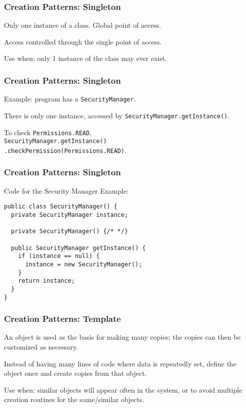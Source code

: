 \begin{frame}
\frametitle{Creation Patterns: Singleton}
\begin{changemargin}{1cm}
Only one instance of a class. Global point of access.

Access controlled through the single point of access.

Use when: only 1 instance of the class may ever exist.

\end{changemargin}
\end{frame}

\begin{frame}
\frametitle{Creation Patterns: Singleton}
\begin{changemargin}{1cm}

Example: program has a \texttt{SecurityManager}.

There is only one instance, accessed by \texttt{SecurityManager.getInstance()}.

To check \texttt{Permissions.READ},\\ \texttt{SecurityManager.getInstance()\\.checkPermission(Permissions.READ)}.


\end{changemargin}
\end{frame}

\begin{frame}[fragile]
\frametitle{Creation Patterns: Singleton}
\begin{changemargin}{1cm}
Code for the Security Manager Example:

\begin{verbatim}
public class SecurityManager() {
  private SecurityManager instance;
  
  private SecurityManager() {/* */}
  
  public SecurityManager getInstance() {
    if (instance == null) {
      instance = new SecurityManager();
    }
    return instance;
  }
}  
\end{verbatim}
\end{changemargin}
\end{frame}


\begin{frame}
\frametitle{Creation Patterns: Template}
\begin{changemargin}{1cm}

An object is used as the basis for making many copies; the copies can then be customized as necessary.

Instead of having many lines of code where data is repeatedly set, define the object once and create copies from that object.

Use when: similar objects will appear often in the system, or to avoid multiple creation routines for the same/similar objects.

\end{changemargin}
\end{frame}


